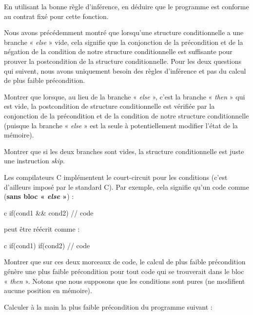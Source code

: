 En utilisant la bonne règle d'inférence, en déduire que le programme est
conforme au contrat fixé pour cette fonction.




Nous avons précédemment montré que lorsqu'une structure conditionnelle a une branche
« \textit{else} » vide, cela signifie que la conjonction de la précondition et de la négation
de la condition de notre structure conditionnelle est suffisante pour prouver la
postcondition de la structure conditionnelle.
Pour les deux questions qui suivent, nous avons uniquement besoin des règles d'inférence
et pas du calcul de plus faible précondition.


Montrer que lorsque, au lieu de la branche « \textit{else} », c'est la branche « \textit{then} » qui est
vide, la postcondition de structure conditionnelle est vérifiée par la conjonction de
la précondition et de la condition de notre structure conditionnelle (puisque
la branche « \textit{else} » est la seule à potentiellement modifier l'état de
la mémoire).


Montrer que si les deux branches sont vides, la structure conditionnelle est juste une
instruction \textit{skip}.




Les compilateurs C implémentent le court-circuit pour les conditions (c'est d'ailleurs
imposé par le standard C). Par exemple, cela signifie qu'un code comme (\textbf{sans
bloc « \textit{else} »}) :


\begin{CodeBlock}{c}
if(cond1 && cond2){
  // code
}
\end{CodeBlock}


peut être réécrit comme :


\begin{CodeBlock}{c}
if(cond1){
  if(cond2){
    // code
  }
}
\end{CodeBlock}


Montrer que sur ces deux morceaux de code, le calcul de plus faible précondition
génère une plus faible précondition pour tout code qui se trouverait dans le bloc
« \textit{then} ». Notons que nous supposons que les conditions sont pures (ne modifient aucune
position en mémoire).





Calculer à la main la plus faible précondition du programme suivant :


